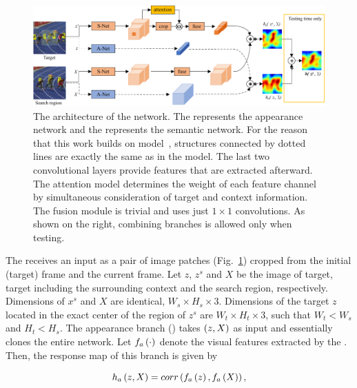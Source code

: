 \begin{figure}[t]
    \centerline{\includegraphics[width=\linewidth]{figures/theoretical_foundations/twofold_siamese_net_architecture.pdf}}
    \caption[ architecture]{The architecture of the  network. The  represents the appearance network and the  represents the semantic network. For the reason that this work builds on  model~\cite{Bertinetto2016}, structures connected by dotted lines are exactly the same as in the  model. The last two convolutional layers provide features that are extracted afterward. The attention model determines the weight of each feature channel by simultaneous consideration of target and context information. The fusion module is trivial and uses just $1 \times 1$ convolutions. As shown on the right, combining branches is allowed only when testing. }
    \label{fig:TwofoldSiameseNetArchitecture}
\end{figure}

The  receives an input as a pair of image patches (Fig.~\ref{fig:TwofoldSiameseNetArchitecture}) cropped from the initial (target) frame and the current frame. Let $z$, $z^s$ and $X$ be the image of target, target including the surrounding context and the search region, respectively. Dimensions of $x^s$ and $X$ are identical, $W_s \times H_s \times 3$. Dimensions of the target $z$ located in the exact center of the region of $z^s$ are $W_t \times H_t \times 3$, such that $W_t < W_s$ and $H_t < H_s$. The appearance branch () takes $\left( {z, X} \right)$ as input and essentially clones the entire  network. Let ${f_a} \left( \cdot \right)$ denote the visual features extracted by the . Then, the response map of this branch is given by

\begin{equation}
    {h_a} \left( z, X \right) = {corr} \left( {f_a} \left( z \right), {f_a} \left( X \right) \right),
\end{equation}

